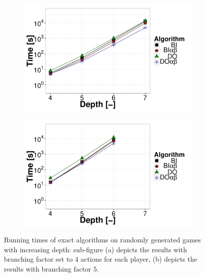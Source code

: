 \begin{figure}
\centering
	\begin{subfigure}{0.49\textwidth}
		\includegraphics[width=1\textwidth]{figures/RG-BF4-BIN-FALSE.pdf}\caption{}\label{fig:off:res:rgbf4}
	\end{subfigure}
	\begin{subfigure}{0.49\textwidth}
		\includegraphics[width=1\textwidth]{figures/RG-BF5-BIN-FALSE.pdf}\caption{}\label{fig:off:res:rgbf5}
	\end{subfigure}
\caption{Running times of exact algorithms on randomly generated games with increasing depth: sub-figure (a) depicts the results with branching factor set to $4$ actions for each player, (b) depicts the results with branching factor $5$.} \label{fig:off:res:rg}
\end{figure}

